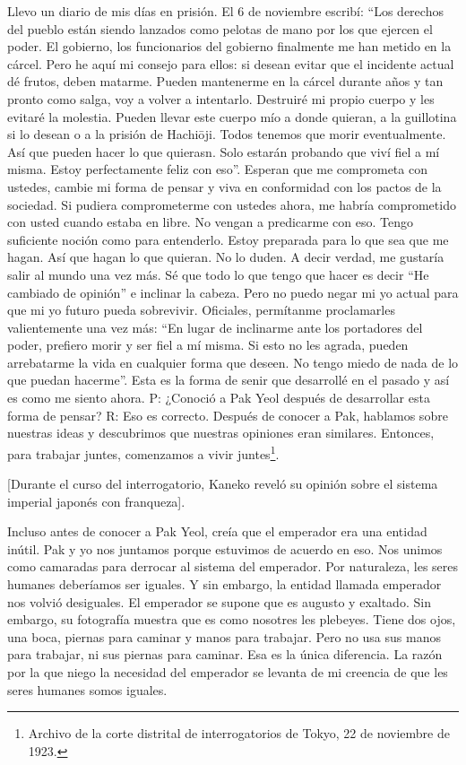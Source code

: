 \documentclass[
]{book}
\begin{document}
Llevo un diario de mis días en prisión. El 6 de noviembre escribí: ``Los derechos del pueblo están siendo lanzados como pelotas de mano por los que ejercen el poder. El gobierno, los funcionarios del gobierno finalmente me han metido en la cárcel. Pero he aquí mi consejo para ellos: si desean evitar que el incidente actual dé frutos, deben matarme. Pueden mantenerme en la cárcel durante años y tan pronto como salga, voy a volver a intentarlo. Destruiré mi propio cuerpo y les evitaré la molestia. Pueden llevar este cuerpo mío a donde quieran, a la guillotina si lo desean o a la prisión de Hachiōji. Todos tenemos que morir eventualmente. Así que pueden hacer lo que quierasn. Solo estarán probando que viví fiel a mí misma. Estoy perfectamente feliz con eso''. Esperan que me comprometa con ustedes, cambie mi forma de pensar y viva en conformidad con los pactos de la sociedad. Si pudiera comprometerme con ustedes ahora, me habría comprometido con usted cuando estaba en libre. No vengan a predicarme con eso. Tengo suficiente noción como para entenderlo. Estoy preparada para lo que sea que me hagan. Así que hagan lo que quieran. No lo duden. A decir verdad, me gustaría salir al mundo una vez más. Sé que todo lo que tengo que hacer es decir ``He cambiado de opinión'' e inclinar la cabeza. Pero no puedo negar mi yo actual para que mi yo futuro pueda sobrevivir.
Oficiales, permítanme proclamarles valientemente una vez más: ``En lugar de inclinarme ante los portadores del poder, prefiero morir y ser fiel a mí misma. Si esto no les agrada, pueden arrebatarme la vida en cualquier forma que deseen. No tengo miedo de nada de lo que puedan hacerme''. Esta es la forma de senir que desarrollé en el pasado y así es como me siento ahora.
P: ¿Conoció a Pak Yeol después de desarrollar esta forma de pensar?
R: Eso es correcto. Después de conocer a Pak, hablamos sobre nuestras ideas y descubrimos que nuestras opiniones eran similares. Entonces, para trabajar juntes, comenzamos a vivir juntes\footnote{Archivo de la corte distrital de interrogatorios de Tokyo, 22 de noviembre de 1923.}.

{[}Durante el curso del interrogatorio, Kaneko reveló su opinión sobre el sistema imperial japonés con franqueza{]}.

Incluso antes de conocer a Pak Yeol, creía que el emperador era una entidad inútil. Pak y yo nos juntamos porque estuvimos de acuerdo en eso. Nos unimos como camaradas para derrocar al sistema del emperador. Por naturaleza, les seres humanes deberíamos ser iguales. Y sin embargo, la entidad llamada emperador nos volvió desiguales. El emperador se supone que es augusto y exaltado. Sin embargo, su fotografía muestra que es como nosotres les plebeyes. Tiene dos ojos, una boca, piernas para caminar y manos para trabajar. Pero no usa sus manos para trabajar, ni sus piernas para caminar. Esa es la única diferencia. La razón por la que niego la necesidad del emperador se levanta de mi creencia de que les seres humanes somos iguales.
\end{document}
